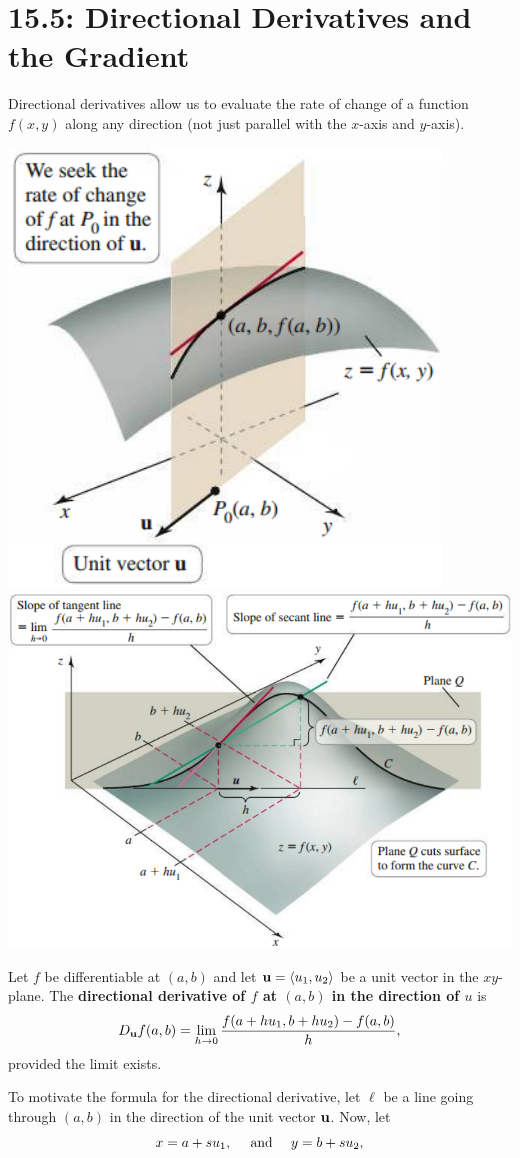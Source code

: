 \documentclass[mathNotesPreamble]{subfiles}
\begin{document}
\section{15.5: Directional Derivatives and the Gradient}
  Directional derivatives allow us to evaluate the rate of change of a function $f(x,y)$ along any direction (not just parallel with the $x$-axis and $y$-axis).

  \begin{center}
    \includegraphics[width=0.375\linewidth]{images/briggs_15_05/fig15_45}
    \includegraphics[width=0.55\linewidth]{images/briggs_15_05/fig15_47}
  \end{center}

  \begin{defn*}
    Let $f$ be differentiable at $(a,b)$ and let ${\mathbf{u}}={\left\langle u_1,u_2 \right\rangle}$ be a unit vector in the $xy$-plane. The \textbf{directional derivative of $f$ at $(a,b)$ in the direction of $u$} is 
      \[D_{\mathbf{u}} f(a,b)=\lim_{h\to 0} \frac{f(a+hu_1,b+hu_2)-f(a,b)}{h},\]
    provided the limit exists.
  \end{defn*}
  \pagebreak

  \noindent
  To motivate the formula for the directional derivative, let $\ell$ be a line going through $(a,b)$ in the direction of the unit vector ${\mathbf{u}}$. Now, let
    \[x=a+su_1,\quad\textnormal{ and }\quad y=b+su_2,\]
\end{document}
